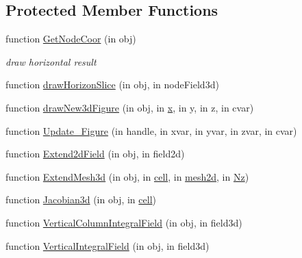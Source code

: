 \subsection*{Protected Member Functions}
\begin{DoxyCompactItemize}
\item 
function \hyperlink{class_ndg_extend_mesh3d_a24f9819859796e6360dec222c6b23425}{Get\+Node\+Coor} (in obj)
\begin{DoxyCompactList}\small\item\em draw horizontal result \end{DoxyCompactList}\item 
function \hyperlink{class_ndg_extend_mesh3d_a9e26fc541395a6e4e2cc7361c6963bd4}{draw\+Horizon\+Slice} (in obj, in node\+Field3d)
\item 
function \hyperlink{class_ndg_extend_mesh3d_a7b27d1422cdb3d67c69d3b1ba56ce829}{draw\+New3d\+Figure} (in obj, in \hyperlink{class_ndg_extend_mesh3d_adf3495103decb1d0f3b93fd0335f4d24}{x}, in y, in z, in cvar)
\item 
function \hyperlink{class_ndg_extend_mesh3d_a7550c35bc76273fb8292114e68b16a23}{Update\+\_\+\+Figure} (in handle, in xvar, in yvar, in zvar, in cvar)
\item 
function \hyperlink{class_ndg_extend_mesh3d_a59dcfe75f7f6c3facd589749512788d3}{Extend2d\+Field} (in obj, in field2d)
\item 
function \hyperlink{class_ndg_extend_mesh3d_a536d7bc178fd14d4e98e389aa7209dd8}{Extend\+Mesh3d} (in obj, in \hyperlink{class_ndg_extend_mesh3d_a56772bd06c09acb1334f90e959f3f767}{cell}, in \hyperlink{class_ndg_extend_mesh3d_a93abeffb02cc5fb2c6b4f8786d31e282}{mesh2d}, in \hyperlink{class_ndg_extend_mesh3d_a68d35b55601da05f983c888ce3309849}{Nz})
\item 
function \hyperlink{class_ndg_extend_mesh3d_a05a1fe6d1353846fbfc886c42228191d}{Jacobian3d} (in obj, in \hyperlink{class_ndg_extend_mesh3d_a56772bd06c09acb1334f90e959f3f767}{cell})
\item 
function \hyperlink{class_ndg_extend_mesh3d_a6d7981dc92a9f06ac9e242128cf44af3}{Vertical\+Column\+Integral\+Field} (in obj, in field3d)
\item 
function \hyperlink{class_ndg_extend_mesh3d_a54bbce0b1db842e3f12aa3f12434c869}{Vertical\+Integral\+Field} (in obj, in field3d)
\end{DoxyCompactItemize}
